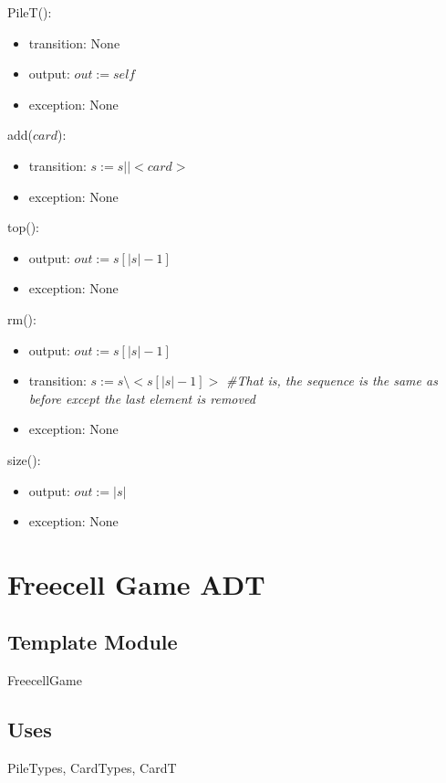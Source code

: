 \documentclass[12pt]{article}
\begin{document}
PileT():
\begin{itemize}
\item transition: None
\item output: $out := \mathit{self}$
\item exception: None
\end{itemize}

\noindent add($card$):
\begin{itemize}
\item transition: $s := s || <card>$
\item exception: None
\end{itemize}

\noindent top():
\begin{itemize}
\item output: $out := s[|s|-1]$
\item exception: None
\end{itemize}

\noindent rm():
\begin{itemize}
\item output: $out := s[|s|-1]$
\item transition: $s := s \setminus <s[|s|-1]>$ \textit{\#That is, the sequence is the same as before except the last element is removed}
\item exception: None
\end{itemize}

\noindent size():
\begin{itemize}
\item output: $out := |s|$ 
\item exception: None
\end{itemize}

\newpage

\section* {Freecell Game ADT}

\subsection* {Template Module}

FreecellGame

\subsection* {Uses}

PileTypes, CardTypes, CardT
\end{document}
